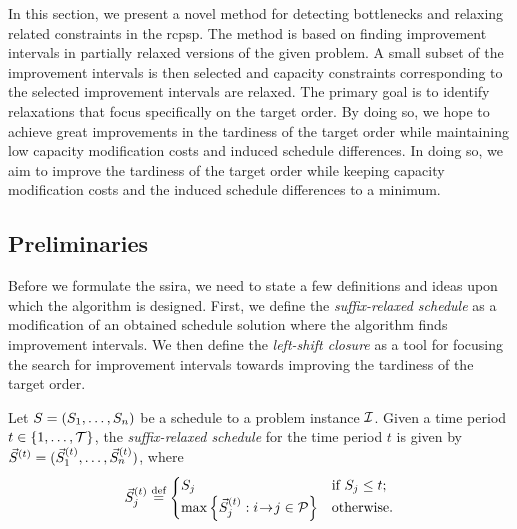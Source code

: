In this section, we present a novel method for detecting bottlenecks
and relaxing related constraints in the \ac{rcpsp}.
The method is based on finding improvement intervals
in partially relaxed versions of the given problem.
A small subset of the improvement intervals is then selected and capacity constraints
corresponding to the selected improvement intervals are relaxed.
The primary goal is to identify relaxations that focus specifically on the target order.
By doing so, we hope to achieve great improvements in the tardiness of the target order
while maintaining low capacity modification costs and induced schedule differences.
In doing so, we aim to improve the tardiness of the target order
while keeping capacity modification costs and the induced schedule differences to a minimum.

\subsection{Preliminaries} \label{subsec:solution-approach/extended-solutin/preliminaries}

Before we formulate the \acl{ssira},
we need to state a few definitions and ideas upon which the algorithm is designed.
First, we define the \emph{suffix-relaxed schedule} as a modification of an obtained schedule solution
where the algorithm finds improvement intervals.
We then define the \emph{left-shift closure} as a tool
for focusing the search for improvement intervals towards improving the tardiness of the target order.

\begin{defn} \label{def:suffix-relaxed-schedule}
    Let $S = (S_{1}, \dots, S_{n})$ be a schedule to a problem instance $\mathcal{I}$.
    Given a time period $t \in \{{1}, \dots, {\mathcal{T}}\}$,
    the \emph{suffix-relaxed schedule} for the time period $t$ is given by
    $\vec{S}^{(t)} = (\vec{S}^{(t)}_{1}, \dots, \vec{S}^{(t)}_{n})$, where
    $$
    \vec{S}^{(t)}_{j} \overset{\text{def}}{=} \begin{cases}
        S_{j} & \text{if $S_{j} \leq t$;} \\
        \max\left\{\vec{S}^{(t)}_{j} : i \hspace{-0.2em} \rightarrow \hspace{-0.2em} j \in \mathcal{P} \right\} & \text{otherwise.}
    \end{cases}
    $$
\end{defn}

